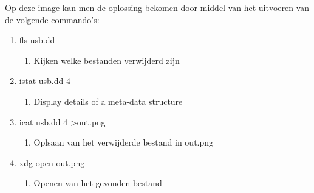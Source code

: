 Op deze image kan men de oplossing bekomen door middel van het uitvoeren van de volgende commando's:
\begin{enumerate}
\item fls usb.dd
\begin{enumerate}
\item Kijken welke bestanden verwijderd zijn
\end{enumerate}
\item istat usb.dd 4
\begin{enumerate}
\item Display details of a meta-data structure
\end{enumerate}
\item icat usb.dd 4 \textgreater out.png
\begin{enumerate}
\item Oplsaan van het verwijderde bestand in out.png
\end{enumerate}
\item xdg-open out.png
\begin{enumerate}
\item Openen van het gevonden bestand
\end{enumerate}
\end{enumerate}